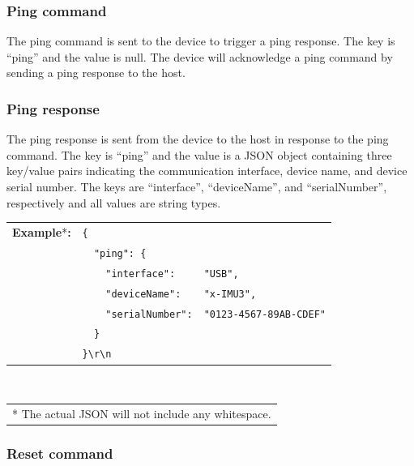 
\subsubsection{Ping command}

The ping command is sent to the device to trigger a ping response.  The key is \enquote{ping} and the value is null.  The device will acknowledge a ping command by sending a ping response to the host.


\subsubsection{Ping response}

The ping response is sent from the device to the host in response to the ping command.  The key is \enquote{ping} and the value is a \ac{JSON} object containing three key/value pairs indicating the communication interface, device name, and device serial number.  The keys are \enquote{interface}, \enquote{deviceName}, and \enquote{serialNumber}, respectively and all values are string types.

\begin{table}[H]
    \begin{tabular}{l l l}
        \textbf{Example}*\textbf{:} & \texttt{\{}\\
        & \texttt{~~"ping":~\{} &\\
        & \texttt{~~~~"interface":} & \texttt{"USB",}\\
        & \texttt{~~~~"deviceName":} & \texttt{"x-IMU3",}\\
        & \texttt{~~~~"serialNumber":} & \texttt{"0123-4567-89AB-CDEF"}\\
        & \texttt{~~\}}\\
        & \texttt{\}\textbackslash r\textbackslash n}\\
    \end{tabular}\\
    \begin{tabular}{l}
        \\
        \footnotesize{* The actual \acs{JSON} will not include any whitespace.}
    \end{tabular}
\end{table}

\subsubsection{Reset command}

